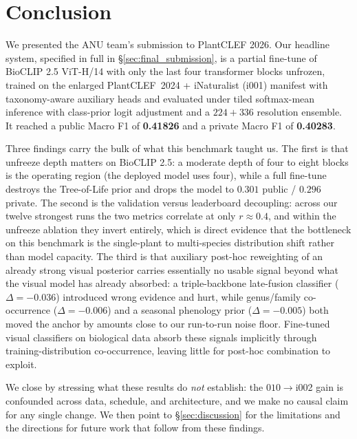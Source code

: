 \section{Conclusion}
\label{sec:conclusion}

We presented the ANU team's submission to PlantCLEF 2026. Our headline system, specified in full
in \S\ref{sec:final_submission}, is a partial fine-tune of BioCLIP 2.5 ViT-H/14 with only the last
four transformer blocks unfrozen, trained on the enlarged PlantCLEF~2024 + iNaturalist (i001) manifest
with taxonomy-aware auxiliary heads and evaluated under tiled softmax-mean inference with class-prior
logit adjustment and a $224{+}336$ resolution ensemble. It reached a public Macro F1 of
\textbf{0.41826} and a private Macro F1 of \textbf{0.40283}.

Three findings carry the bulk of what this benchmark taught us. The first is that unfreeze depth
matters on BioCLIP 2.5: a moderate depth of four to eight blocks is the operating region (the
deployed model uses four), while a full fine-tune destroys the Tree-of-Life prior and drops the
model to $0.301$ public / $0.296$ private. The second is
the validation versus leaderboard decoupling: across our twelve strongest runs the two metrics
correlate at only $r \approx 0.4$, and within the unfreeze ablation they invert entirely, which is
direct evidence that the bottleneck on this benchmark is the single-plant to multi-species
distribution shift rather than model capacity. The third is that auxiliary post-hoc reweighting of
an already strong visual posterior carries essentially no usable signal beyond what the visual
model has already absorbed: a triple-backbone late-fusion classifier ($\Delta{=}{-}0.036$) introduced wrong
evidence and hurt, while genus/family co-occurrence ($\Delta{=}{-}0.006$) and a seasonal phenology
prior ($\Delta{=}{-}0.005$) both moved the anchor by amounts close to our run-to-run noise floor.
Fine-tuned visual classifiers on biological data absorb these signals implicitly through
training-distribution co-occurrence, leaving little for post-hoc combination to exploit.

We close by stressing what these results do \emph{not} establish: the $010\rightarrow$i002 gain is
confounded across data, schedule, and architecture, and we make no causal claim for any single
change. We then point to \S\ref{sec:discussion} for the limitations and the directions for future
work that follow from these findings.
